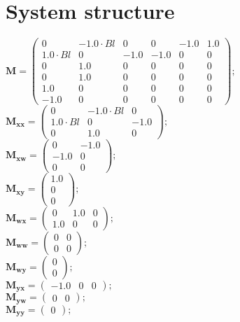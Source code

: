 \documentclass[11pt, oneside]{article}      %
\begin{document}
\section{System structure}
%

%
$ \mathbf{M} = \left(\begin{array}{cccccc}0 & - 1.0 \cdot Bl & 0 & 0 & -1.0 & 1.0\\1.0 \cdot Bl & 0 & -1.0 & -1.0 & 0 & 0\\0 & 1.0 & 0 & 0 & 0 & 0\\0 & 1.0 & 0 & 0 & 0 & 0\\1.0 & 0 & 0 & 0 & 0 & 0\\-1.0 & 0 & 0 & 0 & 0 & 0\end{array}\right) ; $ 
%
\\
%
$ \mathbf{M_{xx}} = \left(\begin{array}{ccc}0 & - 1.0 \cdot Bl & 0\\1.0 \cdot Bl & 0 & -1.0\\0 & 1.0 & 0\end{array}\right) ; $ 
%
\\
%
$ \mathbf{M_{xw}} = \left(\begin{array}{cc}0 & -1.0\\-1.0 & 0\\0 & 0\end{array}\right) ; $ 
%
\\
%
$ \mathbf{M_{xy}} = \left(\begin{array}{c}1.0\\0\\0\end{array}\right) ; $ 
%
\\
%
$ \mathbf{M_{wx}} = \left(\begin{array}{ccc}0 & 1.0 & 0\\1.0 & 0 & 0\end{array}\right) ; $ 
%
\\
%
$ \mathbf{M_{ww}} = \left(\begin{array}{cc}0 & 0\\0 & 0\end{array}\right) ; $ 
%
\\
%
$ \mathbf{M_{wy}} = \left(\begin{array}{c}0\\0\end{array}\right) ; $ 
%
\\
%
$ \mathbf{M_{yx}} = \left(\begin{array}{ccc}-1.0 & 0 & 0\end{array}\right) ; $ 
%
\\
%
$ \mathbf{M_{yw}} = \left(\begin{array}{cc}0 & 0\end{array}\right) ; $ 
%
\\
%
$ \mathbf{M_{yy}} = \left(\begin{array}{c}0\end{array}\right) ; $ 
%
\\
%
\end{document}
